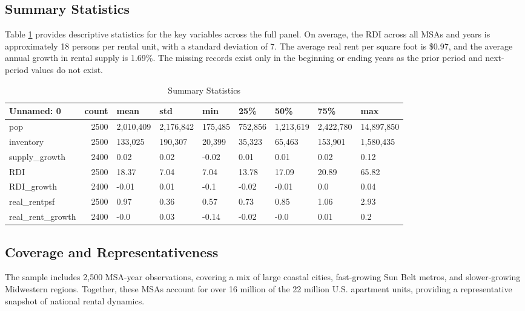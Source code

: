\documentclass[APA,Times1COL]{WileyNJDv5} %
\begin{document}
\subsection{Summary Statistics}
Table \ref{tab:summary_stats} provides descriptive statistics for the key variables across the full panel. On average, the RDI across all MSAs and years is approximately 18 persons per rental unit, with a standard deviation of 7. The average real rent per square foot is \$0.97, and the average annual growth in rental supply is 1.69\%. The missing records exist only in the beginning or ending years as the prior period and next-period values do not exist. 

\begin{table}[hbt!]
	\centering
	\caption{Summary Statistics}
	\label{tab:summary_stats}
	\begin{tabular}{lrlllllll}
		\toprule
		Unnamed: 0 &  count &      mean &       std &     min &     25\% &       50\% &       75\% &        max \\
		\midrule
		pop &   2500 & 2,010,409 & 2,176,842 & 175,485 & 752,856 & 1,213,619 & 2,422,780 & 14,897,850 \\
		inventory &   2500 &   133,025 &   190,307 &  20,399 &  35,323 &    65,463 &   153,901 &  1,580,435 \\
		supply\_growth &   2400 &      0.02 &      0.02 &   -0.02 &    0.01 &      0.01 &      0.02 &       0.12 \\
		RDI &   2500 &     18.37 &      7.04 &    7.04 &   13.78 &     17.09 &     20.89 &      65.82 \\
		RDI\_growth &   2400 &     -0.01 &      0.01 &    -0.1 &   -0.02 &     -0.01 &       0.0 &       0.04 \\
		real\_rentpsf &   2500 &      0.97 &      0.36 &    0.57 &    0.73 &      0.85 &      1.06 &       2.93 \\
		real\_rent\_growth &   2400 &      -0.0 &      0.03 &   -0.14 &   -0.02 &      -0.0 &      0.01 &        0.2 \\
		\bottomrule
	\end{tabular}
\end{table}




\subsection{Coverage and Representativeness}
The sample includes 2,500 MSA-year observations, covering a mix of large coastal cities, fast-growing Sun Belt metros, and slower-growing Midwestern regions. Together, these MSAs account for over 16 million of the 22 million U.S. apartment units, providing a representative snapshot of national rental dynamics. 
\end{document}
